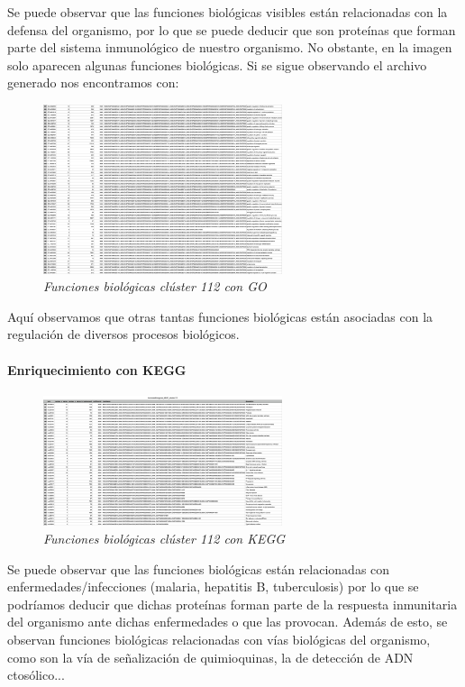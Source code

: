 Se puede observar que las funciones biológicas visibles están relacionadas con la defensa del organismo, por lo que se puede deducir que son proteínas que forman parte del sistema inmunológico de nuestro organismo. No obstante, en la imagen solo aparecen algunas funciones biológicas. Si se sigue observando el archivo generado nos encontramos con:

\begin{figure}[h]
	\centering
	\includegraphics[width=70mm,scale=1.2]{figures/cluster112_GO_2.png}
	\caption{\textit{Funciones biológicas clúster 112 con GO}}
\end{figure}

Aquí observamos que otras tantas funciones biológicas están asociadas con la regulación de diversos procesos biológicos.

\paragraph{Enriquecimiento con KEGG}

\begin{figure}[H]
	\centering
	\includegraphics[width=70mm,scale=1.2]{figures/cluster112_KEGG.png}
	\caption{\textit{Funciones biológicas clúster 112 con KEGG}}
\end{figure}

Se puede observar que las funciones biológicas están relacionadas con enfermedades/infecciones (malaria, hepatitis B, tuberculosis) por lo que se podríamos deducir que dichas proteínas forman parte de la respuesta inmunitaria del organismo ante dichas enfermedades o que las provocan.
Además de esto, se observan funciones biológicas relacionadas con vías biológicas del organismo, como son la vía de señalización de quimioquinas, la de detección de ADN ctosólico...

